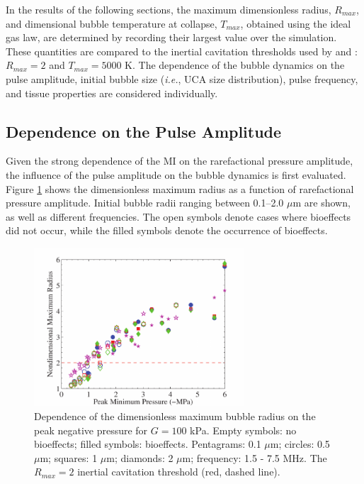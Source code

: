 In the results of the following sections, the maximum dimensionless
radius, $R_{max}$, and dimensional bubble temperature at collapse,
$T_{max}$, obtained using the ideal gas law, are determined by
recording their largest value over the simulation. These quantities
are compared to the inertial cavitation thresholds used by
\cite{Apfel1991} and \cite{Yang2005}: $R_{max}=2$ and $T_{max}=5000$
K. The dependence of the bubble dynamics on the pulse amplitude,
initial bubble size (\emph{i.e.}, UCA size distribution), pulse
frequency, and tissue properties are considered individually.



\subsection{Dependence on the Pulse Amplitude}
Given the strong dependence of the MI on the rarefactional pressure
amplitude, the influence of the pulse amplitude on the bubble dynamics
is first evaluated. Figure \ref{fig:amplitude} shows the dimensionless
maximum radius as a function of rarefactional pressure
amplitude. Initial bubble radii ranging between 0.1--2.0 $\mu$m are
shown, as well as different frequencies. The open symbols denote
cases where bioeffects did not occur, while the filled symbols denote
the occurrence of bioeffects.

\begin{figure}[t]
  \centering
  \includegraphics[width=0.7\textwidth]{figs/bubble_figs/Rstarmax_Pm}
  \caption[Dependence of the dimensionless maximum bubble radius on
  the peak negative pressure for $G=100$ kPa.]{Dependence of the
    dimensionless maximum bubble radius on the peak negative pressure
    for $G=100$ kPa.  Empty symbols: no bioeffects; filled symbols:
    bioeffects. Pentagrams: 0.1 $\mu$m; circles: 0.5 $\mu$m; squares:
    1 $\mu$m; diamonds: 2 $\mu$m; frequency: 1.5 - 7.5 MHz. The
    $R_{max}=2$ inertial cavitation threshold (red, dashed line).
  }
  \label{fig:amplitude}
\end{figure}

